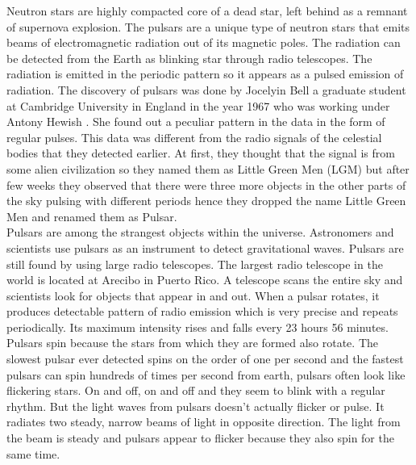 \hspace{0.6cm}Neutron stars are highly compacted core of a dead star, left behind as a remnant of supernova explosion. The pulsars are a unique type of neutron stars that emits beams of electromagnetic radiation out of its magnetic poles. The radiation can be detected from the Earth as blinking star through radio telescopes. The radiation is emitted in the periodic pattern so it appears as a pulsed emission of radiation. The discovery of pulsars was done by Jocelyin Bell a graduate student at Cambridge University in England in the year 1967 who was working under Antony Hewish \cite{AstronomyAndbeyond:1999}. She found out a peculiar pattern in the data in the form of regular pulses. This data was different from the radio signals of the celestial bodies that they detected earlier. At first, they thought that the signal is from some alien civilization so they named them as Little Green Men (LGM) but after few weeks they observed that there were three more objects in the other parts of the sky pulsing with different periods hence they dropped the name Little Green Men and renamed them as Pulsar.\\

Pulsars are among the strangest objects within the universe. Astronomers and scientists use pulsars as an instrument to detect gravitational waves. Pulsars are still found by using large radio telescopes. The largest radio telescope in the world is located at Arecibo in Puerto Rico. A telescope scans the entire sky and scientists look for objects that appear in and out. When a pulsar rotates, it produces detectable pattern of radio emission which is very precise and repeats periodically. Its maximum intensity rises and falls every 23 hours 56 minutes. Pulsars spin because the stars from which they are formed also rotate. The slowest pulsar ever detected spins on the order of one per second and the fastest pulsars can spin hundreds of times per second from earth, pulsars often look like flickering stars. On and off, on and off and they seem to blink with a regular rhythm. But the light waves from pulsars doesn't actually flicker or pulse. It radiates two steady, narrow beams of light in opposite direction. The light from the beam is steady and pulsars appear to flicker because they also spin for the same time. \cite{AstronomyAndbeyond:1999}\\

